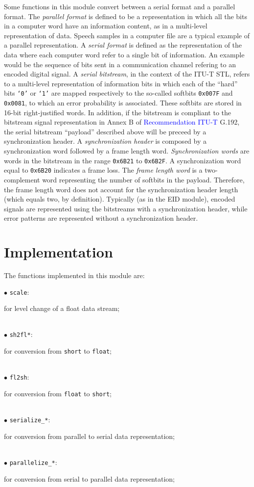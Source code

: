 Some functions in this module convert between a serial format and a
parallel format. The {\em parallel format} is defined to be a
representation in which all the bits in a computer word have an
information content, as in a multi-level representation of
data. Speech samples in a computer file are a typical example of a
parallel representation. A {\em serial format} is defined as the
representation of the data where each computer word refer to a single
bit of information. An example would be the sequence of bits sent in a
communication channel refering to an encoded digital signal. A {\em
serial bitstream}, in the context of the ITU-T STL, refers to a
multi-level representation of information bits in which each of the
``hard'' bits {\tt `0'} or {\tt `1'} are mapped respectively to the
so-called softbits {\tt 0x007F} and {\tt 0x0081}, to which an error
probability is associated. These softbits are stored in 16-bit
right-justified words. In addition, if the bitstream is compliant to
the bitstream signal representation in Annex B of
\textcolor{blue}{Recommendation ITU-T} 
G.192, the serial bitstream ``payload'' described above will be
preceed by a synchronization header. A {\em synchronization header} is
composed by a synchronization word followed by a frame length
word. {\em Synchronization words} are words in the bitstream in the
range {\tt 0x6B21} to {\tt 0x6B2F}. A synchronization word equal to
{\tt 0x6B20} indicates a frame loss. The {\em frame length word} is a
two-complement word representing the number of softbits in the
payload. Therefore, the frame length word does not account for the
synchronization header length (which equals two, by definition).
Typically (as in the EID module), encoded signals are represented
using the bitstreams with a synchronization header, while error
patterns are represented without a synchronization header.

\section{Implementation}

The functions implemented in this module are:

\begin{minipage}{150mm}
$\bullet$ {\tt scale}: \dotfill \parbox[t]{105mm}{
                       for level change of a float data stream;}\\
$\bullet$ {\tt sh2fl*}: \dotfill \parbox[t]{105mm}{
                       for conversion from {\tt short} to {\tt float};}\\
$\bullet$ {\tt fl2sh}: \dotfill \parbox[t]{105mm}{
                       for conversion from {\tt float} to {\tt short};}\\
$\bullet$ {\tt serialize\_*}: \dotfill \parbox[t]{105mm}{
                       for conversion from parallel to serial
                       data representation;}\\
$\bullet$ {\tt parallelize\_*}: \dotfill \parbox[t]{105mm}{
                       for conversion from serial to parallel
                       data representation;}
\end{minipage}

